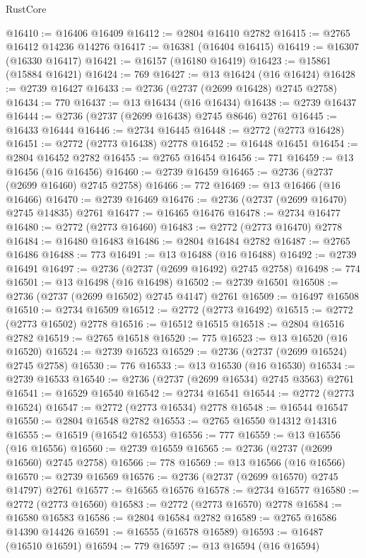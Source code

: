 \begin{lexlean}{RustCore}
\begin{coremodule}
@16410 := @16406 @16409
@16412 := @2804 @16410 @2782
@16415 := @2765 @16412 @14236 @14276
@16417 := @16381 (@16404 @16415)
@16419 := @16307 (@16330 @16417)
@16421 := @16157 (@16180 @16419)
@16423 := @15861 (@15884 @16421)
@16424 := 769
@16427 := @13 @16424 (@16 @16424)
@16428 := @2739 @16427
@16433 := @2736 (@2737 (@2699 @16428) @2745 @2758)
@16434 := 770
@16437 := @13 @16434 (@16 @16434)
@16438 := @2739 @16437
@16444 := @2736 (@2737 (@2699 @16438) @2745 @8646) @2761
@16445 := @16433 @16444
@16446 := @2734 @16445
@16448 := @2772 (@2773 @16428)
@16451 := @2772 (@2773 @16438) @2778
@16452 := @16448 @16451
@16454 := @2804 @16452 @2782
@16455 := @2765 @16454
@16456 := 771
@16459 := @13 @16456 (@16 @16456)
@16460 := @2739 @16459
@16465 := @2736 (@2737 (@2699 @16460) @2745 @2758)
@16466 := 772
@16469 := @13 @16466 (@16 @16466)
@16470 := @2739 @16469
@16476 := @2736 (@2737 (@2699 @16470) @2745 @14835) @2761
@16477 := @16465 @16476
@16478 := @2734 @16477
@16480 := @2772 (@2773 @16460)
@16483 := @2772 (@2773 @16470) @2778
@16484 := @16480 @16483
@16486 := @2804 @16484 @2782
@16487 := @2765 @16486
@16488 := 773
@16491 := @13 @16488 (@16 @16488)
@16492 := @2739 @16491
@16497 := @2736 (@2737 (@2699 @16492) @2745 @2758)
@16498 := 774
@16501 := @13 @16498 (@16 @16498)
@16502 := @2739 @16501
@16508 := @2736 (@2737 (@2699 @16502) @2745 @4147) @2761
@16509 := @16497 @16508
@16510 := @2734 @16509
@16512 := @2772 (@2773 @16492)
@16515 := @2772 (@2773 @16502) @2778
@16516 := @16512 @16515
@16518 := @2804 @16516 @2782
@16519 := @2765 @16518
@16520 := 775
@16523 := @13 @16520 (@16 @16520)
@16524 := @2739 @16523
@16529 := @2736 (@2737 (@2699 @16524) @2745 @2758)
@16530 := 776
@16533 := @13 @16530 (@16 @16530)
@16534 := @2739 @16533
@16540 := @2736 (@2737 (@2699 @16534) @2745 @3563) @2761
@16541 := @16529 @16540
@16542 := @2734 @16541
@16544 := @2772 (@2773 @16524)
@16547 := @2772 (@2773 @16534) @2778
@16548 := @16544 @16547
@16550 := @2804 @16548 @2782
@16553 := @2765 @16550 @14312 @14316
@16555 := @16519 (@16542 @16553)
@16556 := 777
@16559 := @13 @16556 (@16 @16556)
@16560 := @2739 @16559
@16565 := @2736 (@2737 (@2699 @16560) @2745 @2758)
@16566 := 778
@16569 := @13 @16566 (@16 @16566)
@16570 := @2739 @16569
@16576 := @2736 (@2737 (@2699 @16570) @2745 @14797) @2761
@16577 := @16565 @16576
@16578 := @2734 @16577
@16580 := @2772 (@2773 @16560)
@16583 := @2772 (@2773 @16570) @2778
@16584 := @16580 @16583
@16586 := @2804 @16584 @2782
@16589 := @2765 @16586 @14390 @14426
@16591 := @16555 (@16578 @16589)
@16593 := @16487 (@16510 @16591)
@16594 := 779
@16597 := @13 @16594 (@16 @16594)

\end{coremodule}
\end{lexlean}
